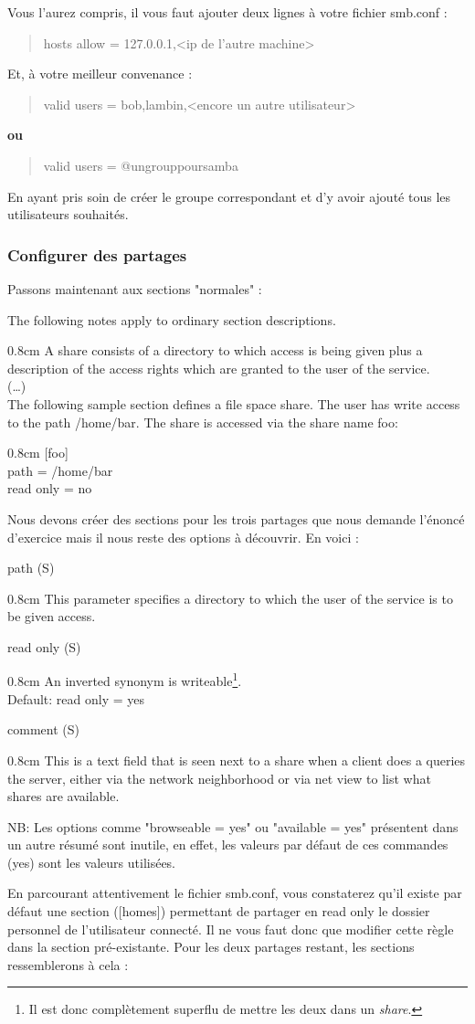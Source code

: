 \documentclass[a4paper,11pt]{article}
\newcommand{\commande}[1] {
    \begin{quote}
    \tt\raggedright #1 
    \end{quote}
}
\newcommand{\man}[2]{
    \begin{tcolorbox}[toprule=3mm,width=\textwidth,outer arc=0mm,colbacktitle=grayman,coltitle=black,colback={grayman},colframe={grayman},title={man : \tt #1}]
        \tt\raggedright #2
    \end{tcolorbox}
}
\newcommand{\mandesc}[1]{
    \begin{adjustwidth}{0.8cm}{}
        #1
    \end{adjustwidth}
}
\begin{document}
\par Vous l'aurez compris, il vous faut ajouter deux lignes à votre fichier smb.conf :
\commande{hosts allow = 127.0.0.1,<ip de l'autre machine>}
\par Et, à votre meilleur convenance :
\commande{valid users = bob,lambin,<encore un autre utilisateur>}
\par \textbf{ou}
\commande{valid users = @ungrouppoursamba}
\par En ayant pris soin de créer le groupe correspondant et d'y avoir ajouté tous les utilisateurs souhaités.

\subsubsection{Configurer des partages}
\par Passons maintenant aux sections "normales" :
\man{smb.conf}{
The following notes apply to ordinary section descriptions.
\mandesc{A share consists of a directory to which access is being given plus a description of the access rights which are granted to the user of the service.\\
(\dots)\\
The following sample section defines a file space share. The user has write access to the path /home/bar. The share is accessed via the share name foo:
\mandesc{[foo]\\
path = /home/bar\\
read only = no\\}}
}
\par Nous devons créer des sections pour les trois partages que nous demande l'énoncé d'exercice mais il nous reste des options à découvrir. En voici :
\man{smb.conf}{
path (S)
\mandesc{This parameter specifies a directory to which the user of the service is to be given access.}
read only (S)
\mandesc{An inverted synonym is writeable\footnote{Il est donc complètement superflu de mettre les deux dans un \emph{share}.}.\\
Default: read only = yes}
comment (S)
\mandesc{This is a text field that is seen next to a share when a client does a queries the server, either via the network neighborhood or via net view to list what shares are available.}
}
\par NB: Les options comme "browseable = yes" ou "available = yes" présentent dans un autre résumé sont inutile, en effet, les valeurs par défaut de ces commandes (yes) sont les valeurs utilisées.
\par En parcourant attentivement le fichier smb.conf, vous constaterez qu'il existe par défaut une section ([homes]) permettant de partager en read only le dossier personnel de l'utilisateur connecté. Il ne vous faut donc que modifier cette règle dans la section pré-existante. Pour les deux partages restant, les sections ressemblerons à cela :
\end{document}
